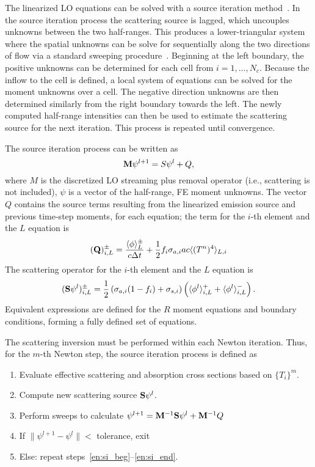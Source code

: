 The linearized LO equations can be solved with a source iteration
method~\cite{lewis,morel_notes,mcclarren_notes}.  In the source iteration
process the scattering source is lagged, which
uncouples unknowns between the two half-ranges.  This produces a lower-triangular
system where the spatial unknowns can be solve for sequentially along the two directions of flow via a
standard sweeping procedure~\cite{lewis,morel_ldtrt}.  Beginning at the left boundary, the
positive unknowns can be determined for each cell from $i=1,\ldots,N_c$.  Because the
inflow to the cell is defined, a local system of equations can be solved for the moment
unknowns over a cell.  The negative direction unknowns are then determined similarly from the
right boundary towards the left.  The newly computed half-range
intensities can then be used to estimate the scattering source for the next iteration.  This
process is repeated until convergence.  

The source iteration process can be written as
\begin{equation}
    \mathbf{M} \psi^{l+1} = S\psi^{l} + Q,
\end{equation}
where $M$ is the discretized LO streaming plus removal operator (i.e., scattering is not
included), $\psi$ is a vector of the half-range, FE moment unknowns.  The vector $Q$
contains the source terms resulting from the linearized emission source and previous
time-step moments, for each equation; the term for the $i$-th element and the $L$ equation
is
\begin{equation}
    (\mathbf{Q})_{i,L}^\pm = \frac{\langle \phi \rangle_L^\pm}{c\Delta t} + \frac{1}{2}f_i \sigma_{a,i} a c \langle 
        (T^{n})^4 \rangle_{L,i}
\end{equation}
The scattering
operator for the $i$-th element and the $L$ equation is
\begin{equation}
    (\mathbf{S} \psi^l)^{\pm}_{i,L} = \frac{1}{2}\left(\sigma_{a,i} (1-f_i) + \sigma_{s,i}\right)
    \left(\langle  \phi^l \rangle_{i,L}^+ + \langle  \phi^l \rangle_{i,L}^-\right).
\end{equation}
Equivalent expressions are defined for the $R$ moment equations and boundary conditions,
forming a fully defined set of equations.

The scattering inversion must be
performed within each Newton iteration.  Thus, for the $m$-th Newton step, the source
iteration process is defined as
\begin{enumerate}
    \item Evaluate effective scattering and absorption cross sections based on
        $\{T_i\}^m$.
    \item\label{en:si_beg} Compute new scattering source $\mathbf{S} \psi^l$.
    \item Perform sweeps to calculate $\psi^{l+1} = \mathbf{M}^{-1} \mathbf{S}\psi^{l} + \mathbf{M}^{-1} Q$
    \item\label{en:si_end} If $\|\psi^{l+1} - \psi^{l} \| < $ tolerance, exit
    \item Else: repeat steps~\ref{en:si_beg}--\ref{en:si_end}.
\end{enumerate}

